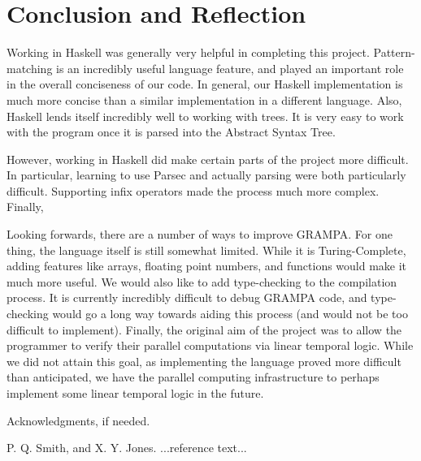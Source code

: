 \documentclass[numbers]{sigplanconf}
\begin{document}
\section{Conclusion and Reflection}

Working in Haskell was generally very helpful in completing this project. Pattern-matching is an incredibly useful language feature, and played an important role in the overall conciseness of our code. In general, our Haskell implementation is much more concise than a similar implementation in a different language. Also, Haskell lends itself incredibly well to working with trees. It is very easy to work with the program once it is parsed into the Abstract Syntax Tree. 

However, working in Haskell did make certain parts of the project more difficult. In particular, learning to use Parsec and actually parsing were both particularly difficult. Supporting infix operators made the process much more complex. Finally, 

Looking forwards, there are a number of ways to improve GRAMPA. For one thing, the language itself is still somewhat limited. While it is Turing-Complete, adding features like arrays, floating point numbers, and functions would make it much more useful. We would also like to add type-checking to the compilation process. It is currently incredibly difficult to debug GRAMPA code, and type-checking would go a long way towards aiding this process (and would not be too difficult to implement). Finally, the original aim of the project was to allow the programmer to verify their parallel computations via linear temporal logic. While we did not attain this goal, as implementing the language proved more difficult than anticipated, we have the parallel computing infrastructure to perhaps implement some linear temporal logic in the future. 

\acks

Acknowledgments, if needed.





\begin{thebibliography}{}
\softraggedright

P. Q. Smith, and X. Y. Jones. ...reference text...

\end{thebibliography}
\end{document}
